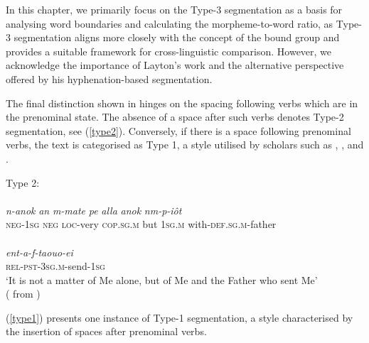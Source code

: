 \documentclass[output=paper,colorlinks,citecolor=brown ,chinesefont]{langscibook}
\begin{document}
In this chapter, we primarily focus on the Type-3 segmentation as a basis for analysing word boundaries and calculating the morpheme-to-word ratio, as Type-3 segmentation aligns more closely with the concept of the bound group and provides a suitable framework for cross-linguistic comparison. However, we acknowledge the importance of Layton's work and the alternative perspective offered by his hyphenation-based segmentation.

The final distinction shown in  hinges on the spacing following verbs which are in the prenominal state. The absence of a space after such verbs denotes Type-2 segmentation, see (\ref{type2}). Conversely, if there is a space following prenominal verbs, the text is categorised as Type 1, a style utilised by scholars such as \citet{till}, \citet{steindorff}, and \citet{quecke}.

\begin{exe}
\ex\label{type2} Type 2: \citet[219]{layton1} \\
\glll {}       \\
\textit{n-anok} 		\textit{an} 	\textit{m-mate} 		\textit{pe} 		\textit{alla} 	\textit{anok} 	\textit{nm-p-iôt}  \\
\textsc{neg}-1\textsc{sg} 	\textsc{neg}  	\textsc{loc}-very 	\textsc{cop}.\textsc{sg}.\textsc{m} 	but 	1\textsc{sg}.\textsc{m} 	with-\textsc{def}.\textsc{sg}.\textsc{m}-father  \\
\glll {} \\
\textit{ent-a-f-taouo-ei} \\
\textsc{rel}-\textsc{pst}-3\textsc{sg}.\textsc{m}-send-1\textsc{sg} \\
\glt ‘It is not a matter of Me alone, but of Me and the Father who sent Me' \\
\hspace*{\fill}( from \citet[219]{layton1})
\end{exe}

(\ref{type1}) presents one instance of Type-1 segmentation, a style characterised by the insertion of spaces after prenominal verbs. 
\end{document}
